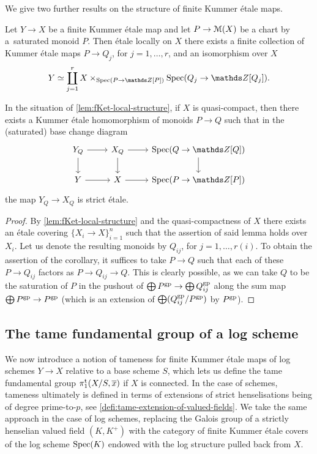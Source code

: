 We give two further results on the structure of finite Kummer \'etale maps.

\begin{lem} 
\label{lem:fKet-local-structure}
    Let $Y\to X$ be a finite Kummer \'etale map and let $P\to {\mathcal M}(X)$ be a chart by a~saturated monoid $P$. Then \'etale locally on $X$ there exists a finite collection of Kummer \'etale maps $P\to Q_j$, for $j=1,\ldots, r$, and an isomorphism over $X$ 
    \[
        Y \simeq \coprod_{j=1}^r X\times_{\Spec(P\to \bZ[P])}\Spec(Q_j\to\bZ[Q_j]).
    \]
\end{lem}

\begin{cor} \label{cor:fKet-local-structure}
    In the situation of \cref{lem:fKet-local-structure}, if $X$ is quasi-compact, then there exists a Kummer \'etale homomorphism of monoids $P\to Q$ such that in the (saturated) base change diagram
    \[ 
     \begin{tikzcd}
         Y_Q \ar[r] \ar[d] & X_Q \ar[d] \ar[r] & \Spec(Q \to \bZ[Q]) \ar[d] \\
         Y \ar[r] & X \ar[r] & \Spec(P \to \bZ[P])
     \end{tikzcd}
    \]
    the map $Y_Q\to X_Q$ is strict \'etale. 
\end{cor}

\begin{proof}
By \cref{lem:fKet-local-structure} and the quasi-compactness of $X$ there exists an \'etale covering $\{X_i\to X\}_{i=1}^n$ such that the assertion of said lemma holds over $X_i$. Let us denote the resulting monoids by $Q_{ij}$, for $j=1, \ldots, r(i)$. To obtain the assertion of the corollary, it suffices to take $P\to Q$ such that each of these $P\to Q_{ij}$ factors as $P\to Q_{ij}\to Q$. This is clearly possible, as we can take $Q$ to be the saturation of $P$ in the pushout of $\bigoplus P^{\rm gp}\to \bigoplus Q_{ij}^{\rm gp}$ along the sum map $\bigoplus P^{\rm gp}\to P^{\rm gp}$ (which is an extension of $\bigoplus (Q_{ij}^{\rm gp}/P^{\rm gp})$ by $P^{\rm gp}$).  
\end{proof}


\subsection{The tame fundamental group of a log scheme}

We now introduce a notion of tameness for finite Kummer \'etale maps of log schemes $Y\to X$ relative to a base scheme $S$, which lets us define the tame fundamental group $\pi_1^{\mathrm{t}}(X/S,\overline{x})$ if $X$ is connected. In the case of schemes, tameness ultimately is defined in terms of extensions of strict henselisations being of degree prime-to-$p$, see \cref{defi:tame-extension-of-valued-fields}. We take the same approach in the case of log schemes, replacing the Galois group of a strictly henselian valued field $(K,K^+)$ with the category of finite Kummer \'etale covers of the log scheme $\operatorname{Spec}(K)$ endowed with the log structure pulled back from $X$. 

